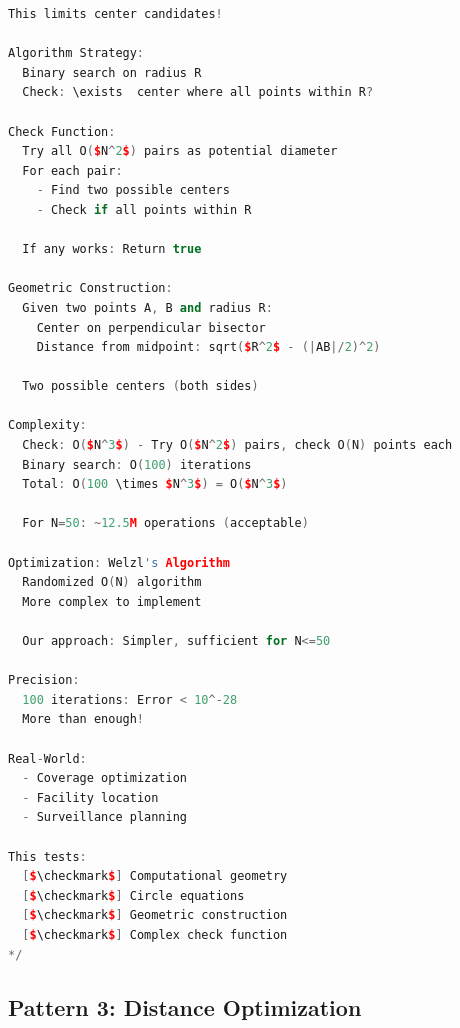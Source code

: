 \documentclass[11pt,a4paper,oneside]{book}
\begin{document}
\begin{lstlisting}[language=C++, caption=Circle and Area Solutions - DETAILED]
  This limits center candidates!

Algorithm Strategy:
  Binary search on radius R
  Check: \exists  center where all points within R?

Check Function:
  Try all O($N^2$) pairs as potential diameter
  For each pair:
    - Find two possible centers
    - Check if all points within R
  
  If any works: Return true

Geometric Construction:
  Given two points A, B and radius R:
    Center on perpendicular bisector
    Distance from midpoint: sqrt($R^2$ - (|AB|/2)^2)
  
  Two possible centers (both sides)

Complexity:
  Check: O($N^3$) - Try O($N^2$) pairs, check O(N) points each
  Binary search: O(100) iterations
  Total: O(100 \times $N^3$) = O($N^3$)
  
  For N=50: ~12.5M operations (acceptable)

Optimization: Welzl's Algorithm
  Randomized O(N) algorithm
  More complex to implement
  
  Our approach: Simpler, sufficient for N<=50

Precision:
  100 iterations: Error < 10^-28
  More than enough!

Real-World:
  - Coverage optimization
  - Facility location
  - Surveillance planning

This tests:
  [$\checkmark$] Computational geometry
  [$\checkmark$] Circle equations
  [$\checkmark$] Geometric construction
  [$\checkmark$] Complex check function
*/
\end{lstlisting}

\subsection{Pattern 3: Distance Optimization}
\end{document}

